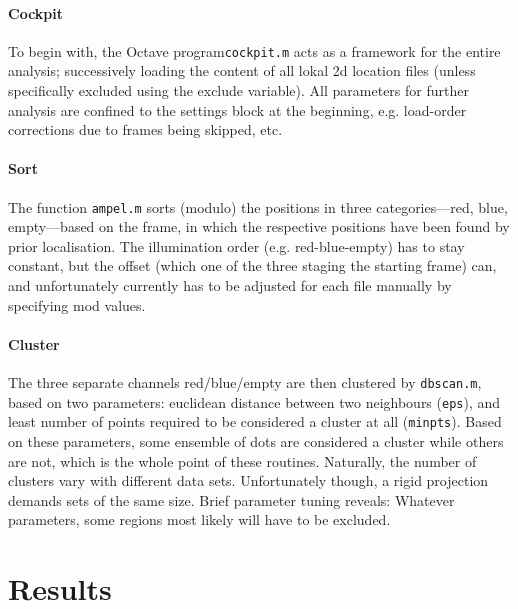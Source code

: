 \documentclass[11pt, a4paper, oneside, twocolumn]{report}
\renewcommand{\tt}{\texttt}
\begin{document}
\subsubsection{Cockpit}
  
To begin with, the Octave program\tt{cockpit.m} acts as a framework
for the entire analysis; successively loading the content of all lokal
2d location files (unless specifically excluded using the exclude
variable). All parameters for further analysis are confined to the
settings block at the beginning, e.g. load-order corrections due to
frames being skipped, etc.


\subsubsection{Sort}

The function \tt{ampel.m} sorts (modulo) the positions in three
categories---red, blue, empty---based on the frame, in which the
respective positions have been found by prior localisation. The
illumination order (e.g. red-blue-empty) has to stay constant, but the
offset (which one of the three staging the starting frame) can, and
unfortunately currently has to be adjusted for each file manually by
specifying mod values.


\subsubsection{Cluster}

The three separate channels red/blue/empty are then clustered by
\tt{dbscan.m}, based on two parameters: euclidean distance between two
neighbours (\tt{eps}), and least number of points required to be
considered a cluster at all (\tt{minpts}). Based on these parameters,
some ensemble of dots are considered a cluster while others are not,
which is the whole point of these routines. Naturally, the number of
clusters vary with different data sets. Unfortunately though, a rigid
projection demands sets of the same size. Brief parameter tuning
reveals: Whatever parameters, some regions most likely will have to be
excluded.

\clearpage\chapter{Results}
\end{document}

